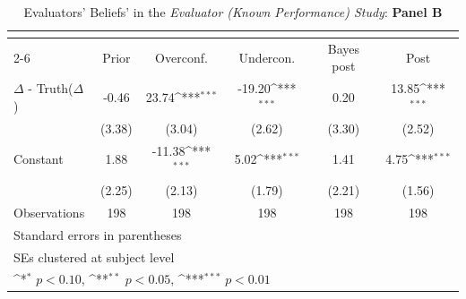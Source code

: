 \begin{table}[htbp]\centering
\def\sym#1{\ifmmode^{#1}\else\(^{#1}\)\fi}
\caption{Evaluators' Beliefs' in the \textit{Evaluator (Known Performance) Study}: \textbf{Panel B}}
\begin{tabular}{l*{5}{c}}
\hline\hline
                &\multicolumn{5}{c}{}                                                                          \\\cmidrule(lr){2-6}
                &\multicolumn{1}{c}{Prior}&\multicolumn{1}{c}{Overconf.}&\multicolumn{1}{c}{Undercon.}&\multicolumn{1}{c}{Bayes post}&\multicolumn{1}{c}{Post}\\
\hline
$\Delta$ - Truth($\Delta$)&    -0.46         &    23.74\sym{***}&   -19.20\sym{***}&     0.20         &    13.85\sym{***}\\
                &   (3.38)         &   (3.04)         &   (2.62)         &   (3.30)         &   (2.52)         \\
Constant        &     1.88         &   -11.38\sym{***}&     5.02\sym{***}&     1.41         &     4.75\sym{***}\\
                &   (2.25)         &   (2.13)         &   (1.79)         &   (2.21)         &   (1.56)         \\
\hline
Observations    &      198         &      198         &      198         &      198         &      198         \\
\hline\hline
\multicolumn{6}{l}{\footnotesize Standard errors in parentheses}\\
\multicolumn{6}{l}{\footnotesize SEs clustered at subject level}\\
\multicolumn{6}{l}{\footnotesize \sym{*} \(p<0.10\), \sym{**} \(p<0.05\), \sym{***} \(p<0.01\)}\\
\end{tabular}
\end{table}
